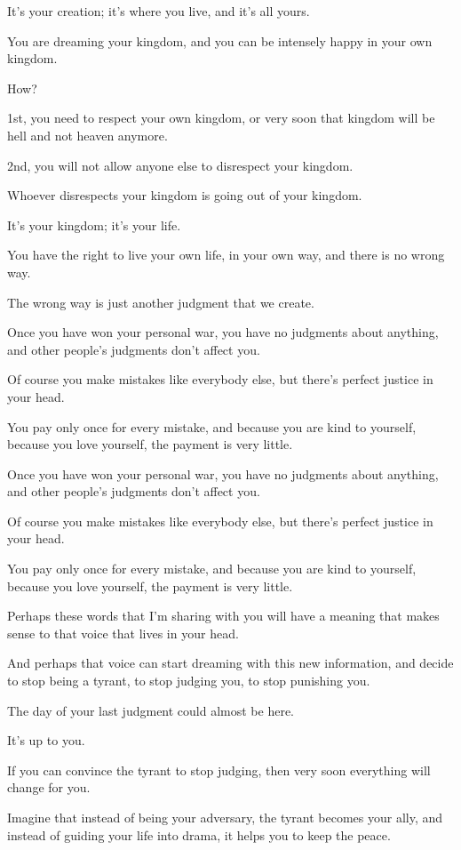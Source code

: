 \documentclass{article}
\numberwithin{equation}{section}
\begin{document}
It's your creation; it's where you live, and it's all yours.

You are dreaming your kingdom, and you can be intensely happy in your own kingdom.

How?

1st, you need to respect your own kingdom, or very soon that kingdom will be hell and not heaven anymore.

2nd, you will not allow anyone else to disrespect your kingdom.

Whoever disrespects your kingdom is going out of your kingdom.

It's your kingdom; it's your life.

You have the right to live your own life, in your own way, and there is no wrong way.

The wrong way is just another judgment that we create.

%
Once you have won your personal war, you have no judgments about anything, and other people's judgments don't affect you.

Of course you make mistakes like everybody else, but there's perfect justice in your head.

You pay only once for every mistake, and because you are kind to yourself, because you love yourself, the payment is very little.

%
Once you have won your personal war, you have no judgments about anything, and other people's judgments don't affect you.

Of course you make mistakes like everybody else, but there's perfect justice in your head.

You pay only once for every mistake, and because you are kind to yourself, because you love yourself, the payment is very little.

%
Perhaps these words that I'm sharing with you will have a meaning that makes sense to that voice that lives in your head.

And perhaps that voice can start dreaming with this new information, and decide to stop being a tyrant, to stop judging you, to stop punishing you.

The day of your last judgment could almost be here.

It's up to you.

If you can convince the tyrant to stop judging, then very soon everything will change for you.

%
Imagine that instead of being your adversary, the tyrant becomes your ally, and instead of guiding your life into drama, it helps you to keep the peace.
\end{document}
